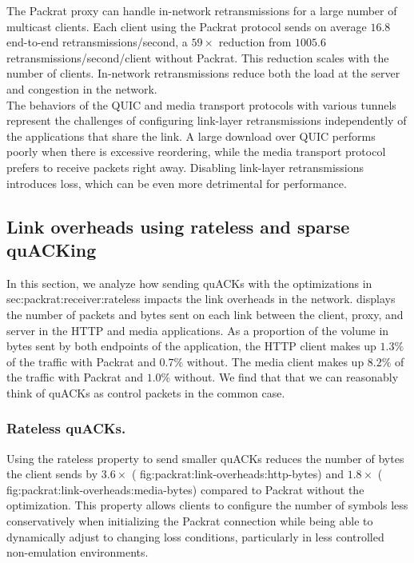 The Packrat proxy can handle in-network retransmissions for a large number of
multicast clients. Each client using the Packrat protocol sends on average $16.8$
end-to-end retransmissions/second, a $59\!\times$ reduction from $1005.6$
retransmissions/second/client without Packrat. This reduction scales with the
number of clients. In-network retransmissions reduce both the load at the
server and congestion in the network.\\

\noindent
The behaviors of the QUIC and media transport protocols with various tunnels
represent the challenges of configuring link-layer retransmissions
independently of the applications that share the link. A large download
over QUIC performs poorly
when there is excessive reordering, while the media transport protocol prefers
to receive packets right away.
Disabling link-layer retransmissions introduces loss, which can be even more
detrimental for performance.

\subsection{Link overheads using rateless and sparse quACKing}
\label{sec:packrat:emulation:link-overheads}



In this section, we analyze how sending quACKs with the optimizations in \Cref
{sec:packrat:receiver:rateless} impacts the link overheads in the network.
 displays the number of packets and bytes sent on each
link between the client, proxy, and server in the HTTP and media applications.
As a proportion of the volume in bytes sent by both endpoints of the
application, the HTTP client makes up $1.3\%$ of the traffic with Packrat and
$0.7\%$ without. The media client makes up $8.2\%$ of the traffic with Packrat
and $1.0\%$ without. We find that that we can reasonably think of quACKs as
control packets in the common case.

\subsubsection{Rateless quACKs.}
Using the rateless property to send smaller quACKs
reduces the number of bytes the client sends by $3.6\!\times$ (\Cref
{fig:packrat:link-overheads:http-bytes}) and $1.8\!\times$ (\Cref
{fig:packrat:link-overheads:media-bytes}) compared to Packrat without the optimization.
This property allows clients to configure the number of symbols less
conservatively when initializing the Packrat connection while being able to
dynamically adjust to changing loss conditions, particularly in less controlled
non-emulation environments.

